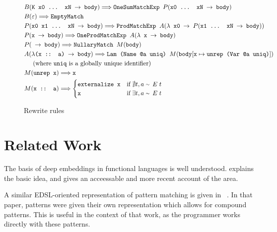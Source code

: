 \documentclass[sigplan,anonymous,review]{acmart}
\newcommand{\expr}[1]{(#1)} %
\newcommand{\rarr}{\rightarrow}
\newcommand{\rewrites}{\Longrightarrow}
\newcommand{\typeeq}{\raise.17ex\hbox{$\scriptstyle\mathtt{\sim}$}\,\;}
\newcommand{\ttt}{\texttt}
\newcommand{\showtodos}{}  %
\newenvironment{todo}
  {\ifthenelse{\isundefined{\showtodos}}{\comment}{\begin{tcolorbox}
    \textbf{TODO}:}}
  {\ifthenelse{\isundefined{\showtodos}}{\endcomment}{\end{tcolorbox}}
  }
\begin{document}
\begin{figure}[hp]
\begin{align*}
  &B\expr{\ttt{K x0 ... xN $\rarr$ body}} \rewrites \ttt{OneSumMatchExp }P\expr{\ttt{x0 ... xN $\rarr$ body}}\\
  &B\expr{\ttt{$\varepsilon$}} \rewrites \ttt{EmptyMatch}\\
  &P\expr{\ttt{x0 x1 ... xN $\rarr$ body}} \rewrites \ttt{ProdMatchExp }A\expr{\ttt{$\lambda$ x0 $\rarr$ $P\expr{\ttt{x1 ... xN $\rarr$ body}}$}}\\
  &P\expr{\ttt{x $\rarr$ body}} \rewrites \ttt{OneProdMatchExp }A\expr{\ttt{$\lambda$ x $\rarr$ body}}\\
  &P\expr{\ttt{ $\rarr$ body}} \rewrites \ttt{NullaryMatch $M\expr{\ttt{body}}$}\\
  &A\expr{\ttt{$\lambda$(x :: a) $\rarr$ body}} \rewrites \ttt{Lam (Name @a uniq) $M\expr{\ttt{body$[\ttt{x} \mapsto \ttt{unrep (Var @a uniq)}]$}}$}\\
  &\text{\;\;\;\;\;(where \ttt{uniq} is a globally unique identifier)}\\
  &M\expr{\ttt{unrep x}} \rewrites \ttt{x}\\
  &M\expr{\ttt{x :: a}} \rewrites
    \begin{cases}
      \ttt{externalize x} & \text{if}\; \nexists t, a\; \typeeq E\; t\\
      \ttt{x} & \text{if}\; \exists t, a\; \typeeq E\; t
    \end{cases}
\end{align*}

\captionsetup{justification=centering}
\caption{Rewrite rules}
\label{fig:Rewrites}
\end{figure}


\clearpage
\section{Related Work}


The basis of deep embeddings in functional languages is well understood.
\cite{Elliott:03:CompileDSEL-JFP} explains the basic idea, and \cite{Gill:2014:DSLSynth}
gives an acceessable and more recent account of the area.

A similar EDSL-oriented representation of pattern matching is given in
~\cite[Section~3.3]{Atkey:09:Unembedding}. In that paper, patterns were given their own
representation which allows for compound patterns. This is useful in the context
of that work, as the programmer works directly with these patterns.
\end{document}
